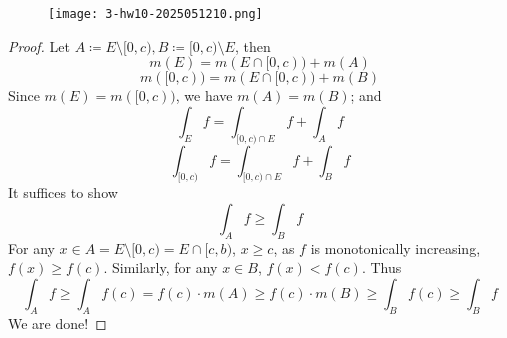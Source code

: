 \begin{exercise}
\begin{figure}[H]
\centering
\texttt{[image: 3-hw10-2025051210.png]}
\label{}
\end{figure}
\end{exercise}
\begin{proof}
Let $A\coloneqq E\setminus[0, c), B\coloneqq[0, c)\setminus E$, then
\[
m(E)=m(E\cap[0,c))+m(A)
\]
\[
m([0,c))=m(E\cap[0,c))+m(B)
\]
Since $m(E)=m([0,c))$, we have $m(A)=m(B)$; and
\[
\int_{E}f=\int_{[0,c)\cap E}f+\int_{A}f
\]
\[
\int_{[0,c)}f=\int_{[0,c)\cap E}f+\int_{B}f
\]
It suffices to show
\[
\int _{A}f\geq \int_{B}f
\]
For any $x\in A=E\setminus[0,c)=E\cap[c,b)$, $x\geq c$, as $f$ is monotonically increasing, $f(x)\geq f(c)$. Similarly, for any $x\in B$, $f (x)<f (c)$. Thus
\[
\int_{A}f\geq \int _{A}f(c)=f(c)\cdot m(A)\geq f(c)\cdot m(B)\geq \int_{B}f(c)\geq \int_{B}f
\]
We are done!
\end{proof}

